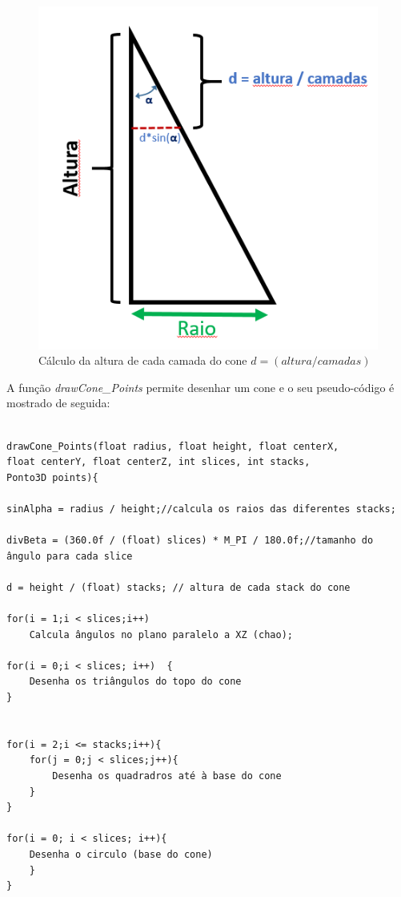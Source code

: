 \begin{figure}[<+htpb+>]
	\centering
	\includegraphics[scale=0.5]{imagens/p3_conePerfil.png}
	\caption{Cálculo da altura de cada camada do cone $d = (altura/camadas)$}
	\label{p1:fig:p3_conePerfil}
\end{figure}

A função \textit{drawCone\_Points} permite desenhar um cone e o seu pseudo-código é mostrado de seguida: 

\begin{Verbatim}

drawCone_Points(float radius, float height, float centerX, 
float centerY, float centerZ, int slices, int stacks, 
Ponto3D points){

sinAlpha = radius / height;//calcula os raios das diferentes stacks;

divBeta = (360.0f / (float) slices) * M_PI / 180.0f;//tamanho do 
ângulo para cada slice

d = height / (float) stacks; // altura de cada stack do cone

for(i = 1;i < slices;i++)
	Calcula ângulos no plano paralelo a XZ (chao);
	
for(i = 0;i < slices; i++)	{
	Desenha os triângulos do topo do cone 
}


for(i = 2;i <= stacks;i++){
	for(j = 0;j < slices;j++){
		Desenha os quadradros até à base do cone
	}
}
	
for(i = 0; i < slices; i++){
	Desenha o circulo (base do cone)
	}
}

\end{Verbatim}


